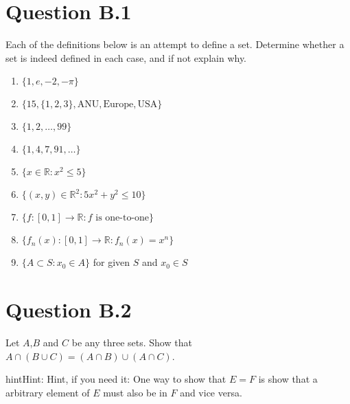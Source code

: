 \documentclass[letterpaper,10pt,english]{jupyterBook}
\begin{document}
\section{Question B.1}
\label{\detokenize{03.exercises.B:question-b-1}}
\sphinxAtStartPar
Each of the definitions below is an attempt to define a set. Determine whether a set is indeed defined in each case, and if not explain why.
\begin{enumerate}
%
\item {} 
\sphinxAtStartPar
\(\{1,e,-2,-\pi\}\)

\item {} 
\sphinxAtStartPar
\(\{15,\{1,2,3\},\text{ANU},\text{Europe},\text{USA}\}\)

\item {} 
\sphinxAtStartPar
\(\{1,2,\dots,99 \}\)

\item {} 
\sphinxAtStartPar
\(\{1,4,7,91, \dots \}\)

\item {} 
\sphinxAtStartPar
\(\{x \in \mathbb{R} \colon x^2 \le 5\}\)

\item {} 
\sphinxAtStartPar
\(\{(x,y) \in \mathbb{R}^2 \colon 5x^2 + y^2 \le 10\}\)

\item {} 
\sphinxAtStartPar
\(\{f \colon [0,1] \rightarrow \mathbb{R} \colon f \text{ is one-to-one} \}\)

\item {} 
\sphinxAtStartPar
\(\{ f_n(x) \colon [0,1] \rightarrow \mathbb{R} \colon f_n(x) = x^n \}\)

\item {} 
\sphinxAtStartPar
\(\{A \subset S : x_0 \in A \}\) for given \(S\) and \(x_0 \in S\)

\end{enumerate}


\section{Question B.2}
\label{\detokenize{03.exercises.B:question-b-2}}
\sphinxAtStartPar
Let \(A\),\(B\) and \(C\) be any three sets.
Show that \(A \cap (B \cup C) = (A\cap B) \cup (A \cap C)\).

\begin{sphinxadmonition}{hint}{Hint:}
\sphinxAtStartPar
Hint, if you need it: One way to show that \(E=F\) is show that a arbitrary element of \(E\) must also be in \(F\) and vice versa.
\end{sphinxadmonition}
\end{document}
